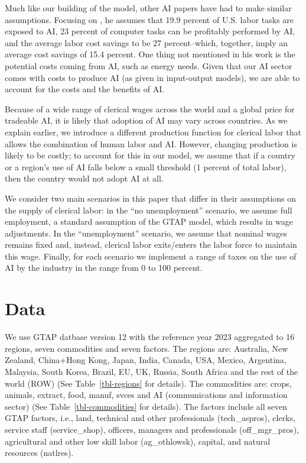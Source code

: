 \documentclass[
  authoryear,
  doubleblind]{elsarticle}
\begin{document}
\normalsize

Much like our building of the model, other AI papers have had to make
similar assumptions. Focusing on \citet{acemoglu2025}, he assumes that
19.9 percent of U.S. labor tasks are exposed to AI, 23 percent of
computer tasks can be profitably performed by AI, and the average labor
cost savings to be 27 percent--which, together, imply an average cost
savings of 15.4 percent. One thing not mentioned in his work is the
potential costs coming from AI, such as energy needs. Given that our AI
sector comes with costs to produce AI (as given in input-output models),
we are able to account for the costs and the benefits of AI.

Because of a wide range of clerical wages across the world and a global
price for tradeable AI, it is likely that adoption of AI may vary across
countries. As we explain earlier, we introduce a different production
function for clerical labor that allows the combination of human labor
and AI. However, changing production is likely to be costly; to account
for this in our model, we assume that if a country or a region's use of
AI falls below a small threshold (1 percent of total labor), then the
country would not adopt AI at all.

We consider two main scenarios in this paper that differ in their
assumptions on the supply of clerical labor: in the ``no unemployment''
scenario, we assume full employment, a standard assumption of the GTAP
model, which results in wage adjustments. In the ``unemployment''
scenario, we assume that nominal wages remains fixed and, instead,
clerical labor exits/enters the labor force to maintain this wage.
Finally, for each scenario we implement a range of taxes on the use of
AI by the industry in the range from 0 to 100 percent.

\section{Data}\label{data}

We use GTAP datbase version 12 with the reference year 2023 aggregated
to 16 regions, seven commodities and seven factors. The regions are:
Australia, New Zealand, China+Hong Kong, Japan, India, Canada, USA,
Mexico, Argentina, Malaysia, South Korea, Brazil, EU, UK, Russia, South
Africa and the rest of the world (ROW) (See Table~\ref{tbl-regions} for
details). The commodities are: crops, animals, extract, food, manuf,
svces and AI (communications and information sector) (See
Table~\ref{tbl-commodities} for details). The factors include all seven
GTAP factors, i.e., land, technical and other professionals
(tech\_aspros), clerks, service staff (service\_shop), officers,
managers and professionals (off\_mgr\_pros), agricultural and other low
skill labor (ag\_othlowsk), capital, and natural resources (natlres).
\end{document}
